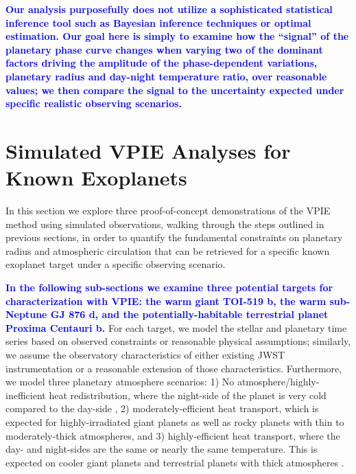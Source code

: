 \documentclass[twocolumn,linenumbers]{aastex7}
\newcommand{\update}[1]{\textcolor{blue}{\bf #1}}
\begin{document}
\update{Our analysis purposefully does not utilize a sophisticated statistical inference tool such as Bayesian inference techniques or optimal estimation. Our goal here is simply to examine how the ``signal'' of the planetary phase curve changes when varying two of the dominant factors driving the amplitude of the phase-dependent variations, planetary radius and day-night temperature ratio, over reasonable values; we then compare the signal to the uncertainty expected under specific realistic observing scenarios.}

\section{Simulated VPIE Analyses for Known Exoplanets}\label{sec:examples}

In this section we explore three proof-of-concept demonstrations of the VPIE method using simulated observations, walking through the steps outlined in previous sections, in order to quantify the fundamental constraints on planetary radius and atmospheric circulation that can be retrieved for a specific known exoplanet target under a specific observing scenario.

\update{In the following sub-sections we examine three potential targets for characterization with VPIE: the warm giant TOI-519 b, the warm sub-Neptune GJ 876 d, and the potentially-habitable terrestrial planet Proxima Centauri b.}
For each target, we model the stellar and planetary time series based on observed constraints or reasonable physical assumptions; similarly, we assume the observatory characteristics of either existing JWST instrumentation or a reasonable extension of those characteristics. Furthermore, we model three planetary atmosphere scenarios: 1) No atmosphere/highly-inefficient heat redistribution, where the night-side of the planet is very cold compared to the day-side \citep{nguyen2020,hammondm2025}, 2) moderately-efficient heat transport, which is expected for highly-irradiated giant planets \citep{perna2012,perez-becker2013,komacek2016} as well as rocky planets with thin to moderately-thick atmospheres, and 3) highly-efficient heat transport, where the day- and night-sides are the same or nearly the same temperature. This is expected on cooler giant planets and terrestrial planets with thick atmospheres \citep{hammond2017}.
\end{document}
